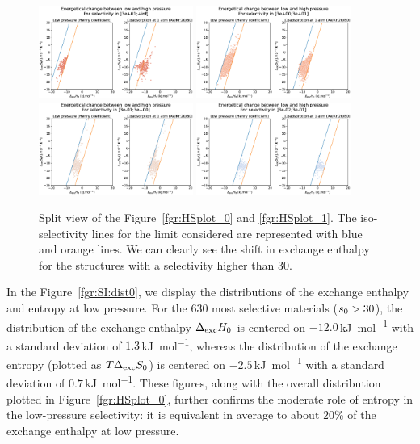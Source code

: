 \documentclass[main.tex]{subfiles}
\begin{document}
\begin{figure}[h]
  \centering
    \includegraphics[width=0.45\textwidth]{figures/2-thermo/H_S_0.jpg}
    \includegraphics[width=0.45\textwidth]{figures/2-thermo/H_S_1.jpg}
    \includegraphics[width=0.45\textwidth]{figures/2-thermo/H_S_2.jpg}
    \includegraphics[width=0.45\textwidth]{figures/2-thermo/H_S_3.jpg}
    \caption{Split view of the Figure~\ref{fgr:HSplot_0} and \ref{fgr:HSplot_1}. The iso-selectivity lines for the limit considered are represented with blue and orange lines. We can clearly see the shift in exchange enthalpy for the structures with a selectivity higher than $30$.}
    \label{fgr:SI:dist1}
\end{figure}


In the Figure~\ref{fgr:SI:dist0}, we display the distributions of the exchange enthalpy and entropy at low pressure. For the 630 most selective materials ($s_{\text{0}} > 30$), the distribution of the exchange enthalpy $\Delta_{\text{exc}}H_{\text{0}}$ is centered on $-12.0$\,\si{\kilo\joule\per\mol} with a standard deviation of $1.3$\,\si{\kilo\joule\per\mol}, whereas the distribution of the exchange entropy (plotted as $T\Delta_{\text{exc}}S_{\text{0}}$) is centered on $-2.5$\,\si{\kilo\joule\per\mol} with a standard deviation of $0.7$\,\si{\kilo\joule\per\mol}. These figures, along with the overall distribution plotted in Figure~\ref{fgr:HSplot_0}, further confirms the moderate role of entropy in the low-pressure selectivity: it is equivalent in average to about {$20$\%} of the exchange enthalpy at low pressure.
\end{document}
